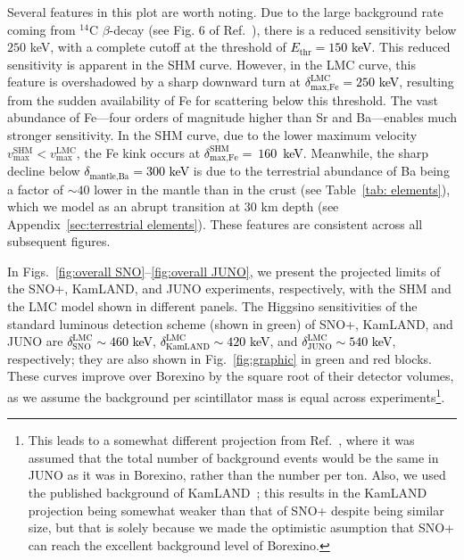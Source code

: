 \documentclass[aps,prd,amsmath,amssymb,10pt,letterpaper,balancelastpage,showpacs,superscriptaddress,nofootinbib,floatfix,notitlepage,longbibliography,twocolumn
]{revtex4-2}
\newcommand{\numcolor}[1]{\textcolor{black}{#1}}
\newcommand{\vmax}{v_{\text{max}}}
\newcommand{\Ethr}{E_{\text{thr}}}
\begin{document}
Several features in this plot are worth noting. Due to the large background rate coming from ${}^{14}\text{C}$ $\beta$-decay (see Fig. 6 of Ref.~\cite{Luminous}), there is a reduced sensitivity below $250$ keV, with a complete cutoff at the threshold of \numcolor{$\Ethr=150$ keV}. This reduced sensitivity is apparent in the SHM curve. However, in the LMC curve, this feature is overshadowed by a sharp downward turn at \numcolor{$\delta^{\text{LMC}}_{\text{max,Fe}} = 250$ keV}, resulting from the sudden availability of Fe for scattering below this threshold. The vast abundance of Fe---four orders of magnitude higher than Sr and Ba---enables much stronger sensitivity. In the SHM curve, due to the lower maximum velocity $\vmax^{\text{SHM}}<\vmax^{\text{LMC}}$, the Fe kink occurs at \numcolor{$\delta^{\text{SHM}}_{\text{max,Fe}}=~160$~keV}. Meanwhile, the sharp decline below \numcolor{$\delta_{\text{{mantle,Ba}}}= 300$ keV} is due to the terrestrial abundance of Ba being a factor of $\sim 40$ lower in the mantle than in the crust (see Table~\ref{tab: elements}), which we model as an abrupt transition at $30$ km depth (see Appendix~\ref{sec:terrestrial elements}). These features are consistent across all subsequent figures.

In Figs.~\ref{fig:overall SNO}--\ref{fig:overall JUNO}, we present the projected limits of the SNO+, KamLAND, and JUNO experiments, respectively, with the SHM and the LMC model shown in different panels. The Higgsino sensitivities of the standard luminous detection scheme (shown in green) of SNO+, KamLAND, and JUNO are \numcolor{$\delta^{\text{LMC}}_{\text{SNO}}\sim 460$ keV}, \numcolor{$\delta^{\text{LMC}}_{\text{KamLAND}}\sim 420$ keV}, and \numcolor{$\delta^{\text{LMC}}_{\text{JUNO}} \sim 540$ keV}, respectively; they are also shown in Fig.~\ref{fig:graphic} in green and red blocks. These curves improve over Borexino by the square root of their detector volumes, as we assume the background per scintillator mass is equal across experiments\footnote{This leads to a somewhat different projection from Ref.~\cite{Luminous}, where it was assumed that the total number of background events would be the same in JUNO as it was in Borexino, rather than the number per ton. Also, we used the published background of KamLAND~\cite{Kamland}; this results in the KamLAND projection being somewhat weaker than that of SNO+ despite being similar size, but that is solely because we made the optimistic asumption that SNO+ can reach the excellent background level of Borexino.}.
\end{document}
